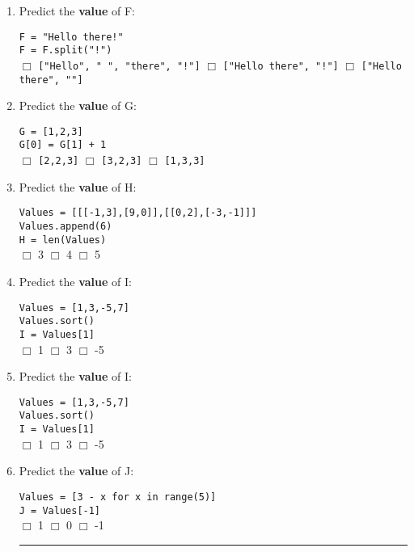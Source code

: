 \documentclass[11pt]{report}
\begin{document}
\begin{enumerate}
    \item Predict the \textbf{value} of F:

    {\tt F = "Hello there!"}\\
    {\tt F = F.split("!")}\\
    $\Box$ {\tt ["Hello", " ", "there", "!"]} \hspace{0.5em} $\Box$ {\tt ["Hello there", "!"]} \hspace{0.5em} $\Box$ {\tt ["Hello there", ""]}

    \item Predict the \textbf{value} of G:

    {\tt G = [1,2,3]}\\
    {\tt G[0] = G[1] + 1}\\
    $\Box$ {\tt [2,2,3]} \hspace{3em} $\Box$ {\tt [3,2,3]} \hspace{3em} $\Box$ {\tt [1,3,3]}

    \item Predict the \textbf{value} of H:

    {\tt Values = [[[-1,3],[9,0]],[[0,2],[-3,-1]]]}\\
    {\tt Values.append(6)}\\
    {\tt H = len(Values)}\\
    $\Box$ 3 \hspace{0.5em} $\Box$ 4 \hspace{0.5em} $\Box$ 5

    \item Predict the \textbf{value} of I:

    {\tt Values = [1,3,-5,7]}\\
    {\tt Values.sort()}\\
    {\tt I = Values[1]}\\
    $\Box$ 1 \hspace{0.5em} $\Box$ 3 \hspace{0.5em} $\Box$ -5

    \item Predict the \textbf{value} of I:

    {\tt Values = [1,3,-5,7]}\\
    {\tt Values.sort()}\\
    {\tt I = Values[1]}\\
    $\Box$ 1 \hspace{0.5em} $\Box$ 3 \hspace{0.5em} $\Box$ -5

    \item Predict the \textbf{value} of J:

    {\tt Values = [3 - x for x in range(5)]}\\
    {\tt J = Values[-1]}\\
    $\Box$ 1 \hspace{0.5em} $\Box$ 0 \hspace{0.5em} $\Box$ -1

    \vspace{2em}
    \hrule
    \vspace{1em}

\end{enumerate}
\end{document}

